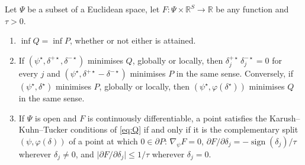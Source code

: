 \begin{proposition}
\label{prop:exact}
Let $\Psi$ be a subset of a Euclidean space, let
$F\colon \Psi\times\mathbb{R}^S \to \mathbb{R}$ be any function and $\tau > 0$.
\begin{enumerate}
  \item[(i)] $\inf Q = \inf P$, whether or not either is attained.
  \item[(ii)] If $(\psi^\star, \delta^{+\star}, \delta^{-\star})$ minimises $Q$,
    globally or locally, then $\delta^{+\star}_j\,\delta^{-\star}_j = 0$ for every
    $j$ and $(\psi^\star, \delta^{+\star} - \delta^{-\star})$ minimises $P$ in the
    same sense. Conversely, if $(\psi^\star, \delta^\star)$ minimises $P$, globally
    or locally, then $(\psi^\star, \varphi(\delta^\star))$ minimises $Q$ in the same
    sense.
  \item[(iii)] If $\Psi$ is open and $F$ is continuously differentiable, a point
    satisfies the Karush--Kuhn--Tucker conditions of \eqref{eq:Q} if and only if
    it is the complementary split $(\psi, \varphi(\delta))$ of a point at which
    $0 \in \partial P$: $\nabla_\psi F = 0$,
    $\partial F/\partial\delta_j = -\operatorname{sign}(\delta_j)/\tau$ wherever
    $\delta_j \ne 0$, and $\lvert\partial F/\partial\delta_j\rvert \le 1/\tau$
    wherever $\delta_j = 0$.
\end{enumerate}
\end{proposition}

